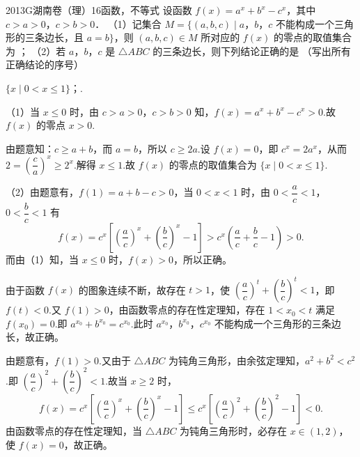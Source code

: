 
\begin{problem}{2013}{G}{湖南卷（理）}{16}{函数，不等式}
设函数 $ f(x)=a^x+b^x-c^x $，其中 $ c>a>0 $，$ c>b>0 $．  
（1）记集合 $ M=\{(a,b,c)\mid a $，$ b $，$ c $ 不能构成一个三角形的三条边长，且 $ a=b\} $，则 $ (a,b,c)\in M $ 所对应的 $ f(x) $ 的零点的取值集合为 \underline{\hspace{4em}}；  
（2）若 $ a $，$ b $，$ c $ 是 $ \triangle ABC $ 的三条边长，则下列结论正确的是 \underline{\hspace{4em}}（写出所有正确结论的序号）  
\begin{choices}
\end{choices}
\end{problem}

\begin{answer}
$\{x\mid 0<x\leq 1\}$；.
\end{answer}

\begin{solutions}
（1）当 $ x\leq 0 $ 时，由 $ c>a>0 $，$ c>b>0 $ 知，$ f(x)=a^x+b^x-c^x>0 $.故 $ f(x) $ 的零点 $ x>0 $.

由题意知：$ c\geq a+b $，而 $ a=b $，所以 $ c\geq 2a $.设 $ f(x)=0 $，即 $ c^x=2a^x $，从而 $ 2=\left(\dfrac{c}{a}\right)^x\geq 2^x $.解得 $ x\leq 1 $.故 $ f(x) $ 的零点的取值集合为 $ \{x\mid 0<x\leq 1\} $.

（2）由题意有，$ f(1)=a+b-c>0 $，当 $ 0<x<1 $ 时，由 $ 0<\dfrac{a}{c}<1 $，$ 0<\dfrac{b}{c}<1 $ 有
$$
f(x)=c^x\left[\left(\dfrac{a}{c}\right)^x+\left(\dfrac{b}{c}\right)^x-1\right]>c^x\left(\dfrac{a}{c}+\dfrac{b}{c}-1\right)>0.
$$
而由（1）知，当 $ x\leq 0 $ 时，$ f(x)>0 $，所以正确。

由于函数 $ f(x) $ 的图象连续不断，故存在 $ t>1 $，使 $ \left(\dfrac{a}{c}\right)^t+\left(\dfrac{b}{c}\right)^t<1 $，即 $ f(t)<0 $.又 $ f(1)>0 $，由函数零点的存在性定理知，存在 $ 1<x_0<t $ 满足 $ f(x_0)=0 $.即 $ a^{x_0}+b^{x_0}=c^{x_0} $.此时 $ a^{x_0} $，$ b^{x_0} $，$ c^{x_0} $ 不能构成一个三角形的三条边长，故正确。

由题意有，$ f(1)>0 $.又由于 $ \triangle ABC $ 为钝角三角形，由余弦定理知，$ a^2+b^2<c^2 $.即 $ \left(\dfrac{a}{c}\right)^2+\left(\dfrac{b}{c}\right)^2<1 $.故当 $ x\geq 2 $ 时，
$$
f(x)=c^x\left[\left(\dfrac{a}{c}\right)^x+\left(\dfrac{b}{c}\right)^x-1\right]\leq c^x\left[\left(\dfrac{a}{c}\right)^2+\left(\dfrac{b}{c}\right)^2-1\right]<0.
$$
由函数零点的存在性定理知，当 $ \triangle ABC $ 为钝角三角形时，必存在 $ x\in(1,2) $，使 $ f(x)=0 $，故正确。
\end{solutions}